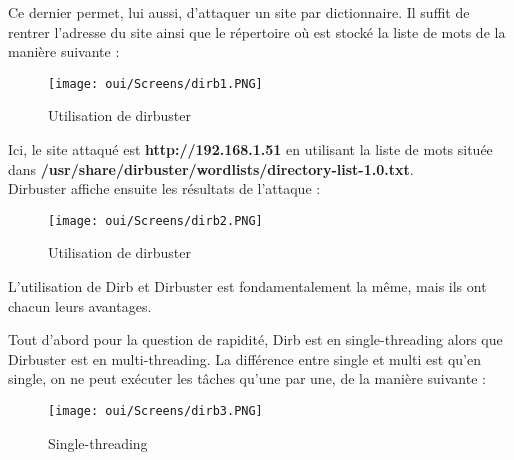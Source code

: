 Ce dernier permet, lui aussi, d’attaquer un site par dictionnaire. Il suffit de rentrer l'adresse du site ainsi que le répertoire où est stocké la liste de mots de la manière suivante : 
\begin{figure}[htp!]
  \centering
  \setlength\figureheight{7cm}
  \setlength\figurewidth{9cm}
  \texttt{[image: oui/Screens/dirb1.PNG]}
  \caption{Utilisation de dirbuster}
  \label{fig:courbe-tikz}
\end{figure}

\newpage
\noindent Ici, le site attaqué est \textbf{http://192.168.1.51} en utilisant la liste de mots située dans \textbf{/usr/share/dirbuster/wordlists/directory-list-1.0.txt}.\\ 
Dirbuster affiche ensuite les résultats de l’attaque : 
\begin{figure}[htp!]
  \centering
  \setlength\figureheight{7cm}
  \setlength\figurewidth{9cm}
  \texttt{[image: oui/Screens/dirb2.PNG]}
  \caption{Utilisation de dirbuster}
  \label{fig:courbe-tikz}
\end{figure}

L’utilisation de Dirb et Dirbuster est fondamentalement la même, mais ils ont chacun leurs avantages. 

Tout d’abord pour la question de rapidité, Dirb est en single-threading alors que Dirbuster est en multi-threading. 
La différence entre single et multi est qu’en single, on ne peut exécuter les tâches qu’une par une, de la manière suivante : 
\begin{center}
   \begin{figure}[htp!]
  \centering
  \setlength\figureheight{7cm}
  \setlength\figurewidth{9cm}
  \texttt{[image: oui/Screens/dirb3.PNG]}
  \caption{Single-threading}
  \label{fig:courbe-tikz}
\end{figure} 
\end{center}

